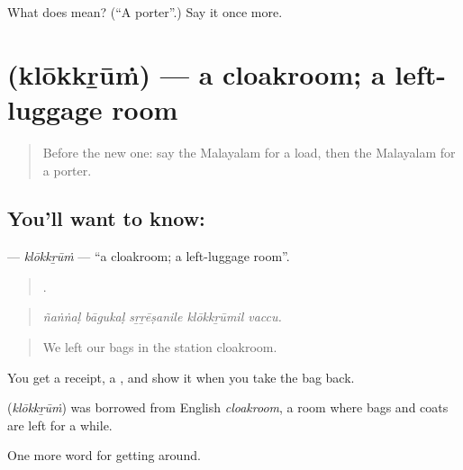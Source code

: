 \begin{tcolorbox}[breakable,colback=teal!4,colframe=teal!35!black,title={Before you move on}]
What does  mean? (\textquotedblleft{}A porter\textquotedblright{}.) Say it once more.
\end{tcolorbox}
\section[\texorpdfstring{\ml{ക്ലോക്ക്റൂം} (klōkkṟūṁ)}{ക്ലോക്ക്റൂം (klōkkṟūṁ)}]{ (klōkkṟūṁ) — a cloakroom; a left-luggage room}

\label{lesson:ML-C466-klokkrum}



\begin{quote}
Before the new one: say the Malayalam for a load, then the Malayalam for a porter.
\end{quote}

\subsection*{You'll want to know: }
\textbf{} — \emph{klōkkṟūṁ} — \textquotedblleft{}a cloakroom; a left-luggage room\textquotedblright{}.

\begin{quote}
    .
\end{quote}

\begin{quote}
\emph{ñaṅṅaḷ bāgukaḷ sṟṟēṣanile klōkkṟūmil vaccu.}
\end{quote}

\begin{quote}
We left our bags in the station cloakroom.
\end{quote}

You get a receipt, a , and show it when you take the bag back.

\begin{cousinweb}
\textbf{} (\emph{klōkkṟūṁ}) was borrowed from English \emph{cloakroom}, a room where bags and coats are left for a while.
\end{cousinweb}

\begin{grammarlens}[title={What you've built}]
One more word for getting around.
\end{grammarlens}

